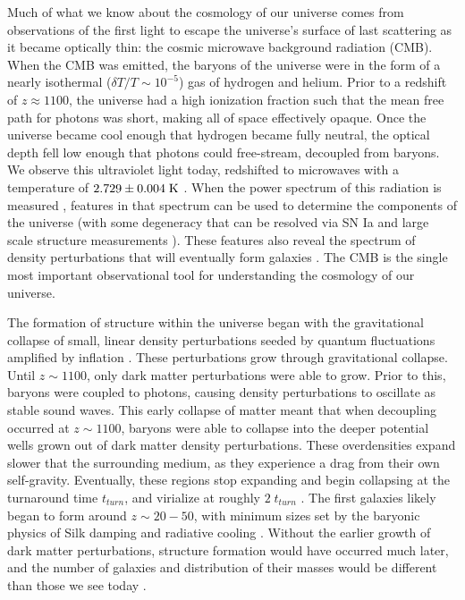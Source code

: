 Much of what we know about the cosmology of our universe comes from observations
of the first light to escape the universe's surface of last scattering as it
became optically thin: the cosmic microwave background radiation (CMB).  
When the CMB was emitted, the baryons of the universe were in the form of a
nearly isothermal ($\delta T/T\sim10^{-5}$) gas of hydrogen and helium.  Prior
to a redshift of $z\approx1100$, the universe had a high ionization fraction
such that the mean free path for photons was short, making all of space
effectively opaque.  Once the universe became cool enough that hydrogen became
fully neutral, the optical depth fell low enough that photons could free-stream,
decoupled from baryons.  We observe this ultraviolet light today, redshifted to
microwaves with a temperature of $2.729\pm0.004\;\rm{K}$ \citep{Fixsen1996}.
When the power spectrum of this radiation is measured \citep{Spergel2003},
features in that spectrum can be used to determine the components of the
universe (with some degeneracy that can be resolved via SN Ia and large scale
structure measurements
\citep{Riess1998,Perlmutter1999,Beutler2011,Blake2011}). These features also
reveal the spectrum of density perturbations that will eventually form galaxies
\citep{Press1974,Peebles1980}.   The CMB is the single most important
observational tool for understanding the cosmology of our universe.

The formation of structure within the universe began with the gravitational
collapse of small, linear density perturbations seeded by quantum fluctuations
amplified by inflation \citep{Guth1981,Linde1982}.  These perturbations grow
through gravitational collapse.  Until $z\sim1100$, only dark matter
perturbations were able to grow.  Prior to this, baryons were coupled to
photons, causing density perturbations to oscillate as stable sound waves.  This
early collapse of matter meant that when decoupling occurred at $z\sim1100$,
baryons were able to collapse into the deeper potential wells grown out of
dark matter density perturbations.  These overdensities expand slower that the
surrounding medium, as they experience a drag from their own self-gravity.
Eventually, these regions stop expanding and begin collapsing at the turnaround
time $t_{turn}$, and virialize at roughly $2\;t_{turn}$ \citep{Peebles1980}.
The first galaxies likely began to form around $z\sim20-50$, with minimum sizes
set by the baryonic physics of Silk damping and radiative cooling
\citep{Silk1968}.  Without the earlier growth of dark matter perturbations,
structure formation would have occurred much later, and the number of galaxies
and distribution of their masses would be different than those we see today
\citep{Davis1985}.

